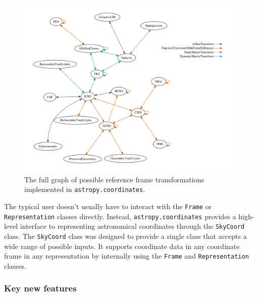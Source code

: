 \documentclass[modern]{aastex61}
\begin{document}
\begin{figure}
\includegraphics[width=\textwidth]{coordinates_graph.pdf}
\caption{%
    The full graph of possible reference frame transformations implemented in
    \texttt{astropy.coordinates}.
    \label{fig:frame-transform-graph}
}
\end{figure}

The typical user doesn't usually have to interact with the \texttt{Frame} or
\texttt{Representation} classes directly.
Instead, \texttt{astropy.coordinates} provides a high-level interface to
representing astronomical coordinates through the \texttt{SkyCoord} class.
The \texttt{SkyCoord} class was designed to provide a single class that
accepts a wide range of possible inputs.
It supports coordinate data in any coordinate frame in any representation by
internally using the \texttt{Frame} and \texttt{Representation} classes.

\subsubsection{Key new features}
\end{document}
